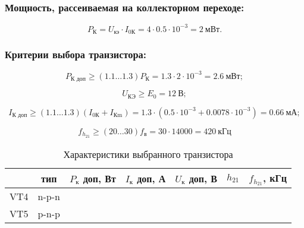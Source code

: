   \begin{equation}
  \label{eq:equation6_9}
   
  \end{equation}
  
  \subsubsection{Мощность, рассеиваемая на коллекторном переходе:} %

  \begin{equation}
  \label{eq:equation6_10}
    P_{\text{К}} = U_{\text{кэ}} \cdot I_{\text{0К}} = 4 \cdot 0.5 \cdot 10^{-3} = 2~\text{мВт}. 
  \end{equation}
  

  \subsubsection{Критерии выбора транзистора:} %

  \begin{equation}
  \label{eq:equation6_11}
    P_{\text{К доп}} \geq (1.1 \ldots 1.3) P_{\text{К}} = 1.3 \cdot 2 \cdot 10^{-3} = 2.6~\text{мВт};
  \end{equation} 

  \begin{equation}
   \label{eq:equation6_12}
     U_{\text{КЭ}} \geq E_0 = 12~\text{В};
  \end{equation} 

  \begin{equation}
  \label{eq:equation6_13}
    I_{\text{К доп}} \geq (1.1 \ldots 1.3)(I_{\text{0К}} + I_{\text{Кm}}) = 1.3 \cdot (0.5 \cdot 10^{-3} + 0.0078 \cdot 10^{-3}) = 0.66~\text{мА}; 
  \end{equation} 

  \begin{equation}
   \label{eq:equation6_14}
     f_{h_{21}} \geq (20 \ldots 30) f_{\text{в}} = 30 \cdot 14000 = 420~\text{кГц}
  \end{equation} 

\begin{table}[htbp]
\caption{Характеристики выбранного транзистора}
\begin{center}\begin{tabular}{|c|c|c|c|c|c|c|}
\hline 
  & тип & $P_{\text{к}}$ доп, Вт & $I_{\text{к}}$ доп, А & $U_{\text{к}}$ доп, В & $h_{21}$ &  $f_{h_{21}}$, кГц \\ 
\hline 
VT4 & n-p-n &   &  &  &  & \\ 
\hline 
VT5 & p-n-p &   &  &  &  &  \\ 
\hline 
\end{tabular} 
\end{center}
\end{table}


